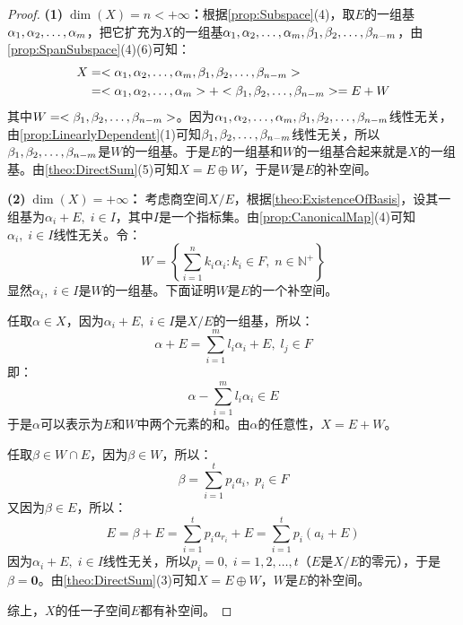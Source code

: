\begin{proof}
	\textbf{(1)$\;\dim(X)=n<+\infty$：}根据\cref{prop:Subspace}(4)，取$E$的一组基$\alpha_1, \alpha_2, \dots, \alpha_{m}$，把它扩充为$X$的一组基$\alpha_1, \alpha_2, \dots, \alpha_{m},\beta_1, \beta_2, \dots, \beta_{n-m}$，由\cref{prop:SpanSubspace}(4)(6)可知：
	\begin{align*}
		X
		&=<\alpha_1, \alpha_2, \dots, \alpha_{m},\beta_1, \beta_2, \dots, \beta_{n-m}> \\
		&=<\alpha_1, \alpha_2, \dots, \alpha_{m}>+<\beta_1, \beta_2, \dots, \beta_{n-m}>=E+W
	\end{align*}
	其中$W=<\beta_1, \beta_2, \dots, \beta_{n-m}>$。因为$\alpha_1, \alpha_2, \dots, \alpha_{m},\beta_1, \beta_2, \dots, \beta_{n-m}$线性无关，由\cref{prop:LinearlyDependent}(1)可知$\beta_1, \beta_2, \dots, \beta_{n-m}$线性无关，所以$\beta_1, \beta_2, \dots, \beta_{n-m}$是$W$的一组基。于是$E$的一组基和$W$的一组基合起来就是$X$的一组基。由\cref{theo:DirectSum}(5)可知$X=E\oplus W$，于是$W$是$E$的补空间。\par
	\textbf{(2)$\;\dim(X)=+\infty$：}
	考虑商空间$X/E$，根据\cref{theo:ExistenceOfBasis}，设其一组基为$\alpha_i+E,\;i\in I$，其中$I$是一个指标集。由\cref{prop:CanonicalMap}(4)可知$\alpha_i,\;i\in I$线性无关。令：
	\begin{equation*}
		W=\left\{\sum_{i=1}^{n}k_i\alpha_{i}:k_i\in F,\;n\in\mathbb{N}^+\right\}
	\end{equation*}
	显然$\alpha_i,\;i\in I$是$W$的一组基。下面证明$W$是$E$的一个补空间。\par
	任取$\alpha\in X$，因为$\alpha_i+E,\;i\in I$是$X/E$的一组基，所以：
	\begin{equation*}
		\alpha+E=\sum_{i=1}^{m}l_i\alpha_{i}+E,\;l_j\in F
	\end{equation*}
	即：
	\begin{equation*}
		\alpha-\sum_{i=1}^{m}l_i\alpha_{i}\in E
	\end{equation*}
	于是$\alpha$可以表示为$E$和$W$中两个元素的和。由$\alpha$的任意性，$X=E+W$。\par
	任取$\beta\in W\cap E$，因为$\beta\in W$，所以：
	\begin{equation*}
		\beta=\sum_{i=1}^{t}p_ia_{i},\;p_i\in F
	\end{equation*}
	又因为$\beta\in E$，所以：
	\begin{equation*}
		E=\beta+E=\sum_{i=1}^{t}p_ia_{r_i}+E=\sum_{i=1}^{t}p_i(a_{i}+E)
	\end{equation*}
	因为$\alpha_i+E,\;i\in I$线性无关，所以$p_i=0,\;i=1,2,\dots,t$（$E$是$X/E$的零元），于是$\beta=\mathbf{0}$。由\cref{theo:DirectSum}(3)可知$X=E\oplus W$，$W$是$E$的补空间。\par
	综上，$X$的任一子空间$E$都有补空间。
\end{proof}

